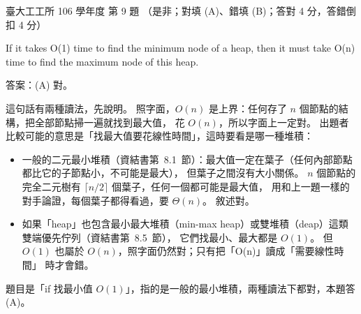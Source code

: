 \begin{pastexam}[label={px:ntu-106-ie-ds-09}]{臺大工工所 106 學年度 第 9 題}
（是非；對填 (A)、錯填 (B)；答對 4 分，答錯倒扣 4 分）

If it takes O(1) time to find the minimum node of a heap, then it must take O(n) time to find the
maximum node of this heap.
\end{pastexam}

\begin{pastsoln}
答案：(A) 對。

這句話有兩種讀法，先說明。 照字面，$O(n)$ 是上界：任何存了 $n$ 個節點的結構，把全部節點掃一遍就找到最大值，
花 $O(n)$，所以字面上一定對。 出題者比較可能的意思是「找最大值要花線性時間」，這時要看是哪一種堆積：
\begin{itemize}
\item 一般的二元最小堆積（資結書第~8.1~節）：最大值一定在葉子（任何內部節點都比它的子節點小，不可能是最大），
但葉子之間沒有大小關係。 $n$ 個節點的完全二元樹有 $\lceil n/2 \rceil$ 個葉子，任何一個都可能是最大值，
用和上一題一樣的對手論證，每個葉子都得看過，要 $\Theta(n)$。 敘述對。
\item 如果「heap」也包含最小最大堆積（min-max heap）或雙堆積（deap）這類雙端優先佇列（資結書第~8.5~節），
它們找最小、最大都是 $O(1)$。 但 $O(1)$ 也屬於 $O(n)$，照字面仍然對；只有把「O(n)」讀成「需要線性時間」
時才會錯。
\end{itemize}
題目是「if 找最小值 $O(1)$」，指的是一般的最小堆積，兩種讀法下都對，本題答 (A)。
\end{pastsoln}
